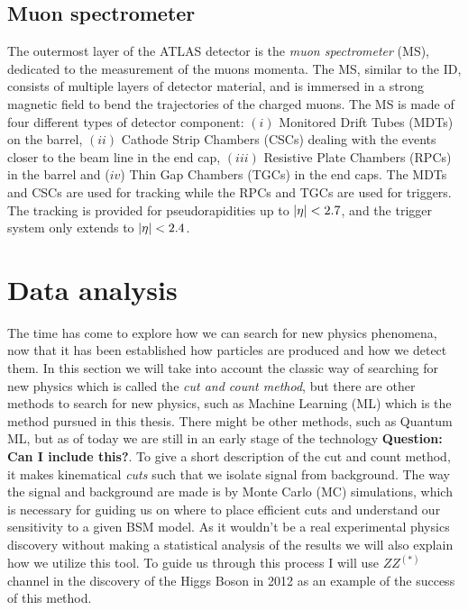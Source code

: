 \documentclass[12pt, a4paper]{book}
\begin{document}
\subsection{Muon spectrometer}\label{sec:MS}
The outermost layer of the ATLAS detector is the \textit{muon spectrometer} (MS), dedicated to the measurement of the muons momenta. The MS, similar to the ID, consists of multiple layers of detector material, 
and is immersed in a strong magnetic field to bend the trajectories of the charged muons. The MS is made of four different types of detector component: $(i)$ Monitored Drift Tubes (MDTs) on the barrel, 
$(ii)$ Cathode Strip Chambers (CSCs) dealing with the events closer to the beam line in the end cap, $(iii)$ Resistive Plate Chambers (RPCs) in the barrel and ($iv$) Thin Gap Chambers (TGCs) in the end caps. 
The MDTs and CSCs are used for tracking while the RPCs and TGCs are used for triggers. The tracking is provided for pseudorapidities up to $\abs{\eta}<2.7$, and the trigger system only extends to $\abs{\eta}<2.4$.






\clearpage
\section{Data analysis}\label{sec:data_anal}
The time has come to explore how we can search for new physics phenomena, now that it has been established how particles are produced and how we detect them. In this section we will take into account the classic way of searching for new physics which is called 
the \textit{cut and count method}, but there are other methods to search for new physics, such as Machine Learning (ML) which is the method pursued in this thesis. There might be other methods, such as 
Quantum ML, but as of today we are still in an early stage of the technology \cite{QML}\textbf{Question: Can I include this?}. To give a short description of the cut and count method, it makes kinematical \textit{cuts} such that we isolate signal from background. The way 
the signal and background are made is by Monte Carlo (MC) simulations, which is necessary for guiding us on where to place efficient cuts and understand our sensitivity to a given BSM model. As it wouldn't be a real experimental physics discovery without making a statistical 
analysis of the results we will also explain how we utilize this tool. To guide us through this process I will use $ZZ^{(*)}$ channel in the discovery of the Higgs Boson in 2012 \cite{Higgs_discovery_2012} as an example of the success of this method.
\end{document}
